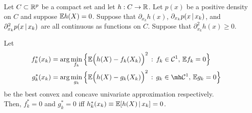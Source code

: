 \begin{proposition}
\label{prop:shape_approx_univariate}
Let $C \subset {\mathbb R}^p$ be a compact set and let $h : C \rightarrow {\mathbb R}$. Let $p(x)$ be a positive density on $C$ and suppose ${\mathbb E} h(X) = 0$. Suppose that $\partial_{x_k} h(x)$, $\partial_{x_k} p( x {\,|\,} x_k)$, and $\partial^2_{x_k} p( x {\,|\,} x_k )$ are all continuous as functions on $C$. Suppose that $\partial^2_{x_k} h(x) \geq 0$.


Let 
\begin{align*}
f^*_k(x_k) &= \arg\min_{f_k} \Big\{
   \E \Big( h(X) - f_k(X_k) \Big)^2 \,:\, f_k \in \mathcal{C}^1,\, \E f_k = 0 \Big\} \\
g^*_k(x_k) &= \arg\min_{g_k} \Big \{
   \E \Big( h(X) - g_k(X_k) \Big)^2 \,:\, g_k \in \mh \mathcal{C}^1 ,\, \E g_k = 0 \Big\}
\end{align*}
be the best convex and concave univariate approximation respectively.\\

Then, $f^*_k = 0$ and $g^*_k = 0$ iff $h^*_k(x_k) \equiv {\mathbb E}[ h(X) {\,|\,} x_k ] = 0$.
\end{proposition}

